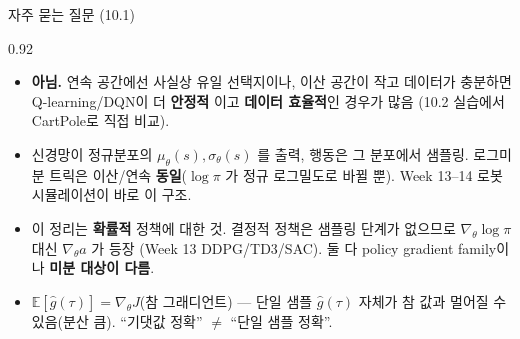 \begin{frame}{자주 묻는 질문 (10.1)}
\begin{center}\begin{varwidth}{0.92\textwidth}
  \small
  \begin{itemize}
    \item {}
      \textbf{아님.} 연속 공간에선 사실상 유일 선택지이나, 이산
      공간이 작고 데이터가 충분하면 Q-learning/DQN이 더 \textbf{안정적}
      이고 \textbf{데이터 효율적}인 경우가 많음 (10.2 실습에서
      CartPole로 직접 비교).
    \item {}
      신경망이 정규분포의 $\mu_\theta(s),\sigma_\theta(s)$ 를 출력,
      행동은 그 분포에서 샘플링. 로그미분 트릭은 이산/연속
      \textbf{동일}($\log\pi$ 가 정규 로그밀도로 바뀔 뿐).
      Week 13--14 로봇 시뮬레이션이 바로 이 구조.
    \item {}
      이 정리는 \textbf{확률적} 정책에 대한 것. 결정적 정책은
      샘플링 단계가 없으므로 $\nabla_\theta\log\pi$ 대신
      $\nabla_\theta a$ 가 등장 (Week 13 DDPG/TD3/SAC).
      둘 다 policy gradient family이나 \textbf{미분 대상이 다름}.
    \item {}
      $\mathbb{E}[\hat g(\tau)] = \nabla_\theta J$(참 그래디언트) ---
      단일 샘플 $\hat g(\tau)$ 자체가 참 값과 멀어질 수 있음(분산 큼).
      ``기댓값 정확'' $\ne$ ``단일 샘플 정확''.
  \end{itemize}
  \normalsize
\end{varwidth}\end{center}
\end{frame}
